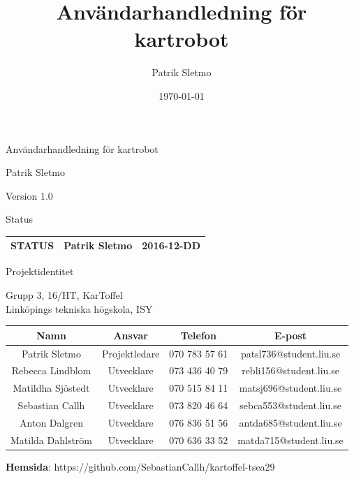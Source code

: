 \documentclass{article}
\title{Användarhandledning för kartrobot}
\author{Patrik Sletmo}
\date{\today}
\begin{document}
\thispagestyle{empty}

{
\sffamily
\centering
\large


{\huge 
Användarhandledning för kartrobot
}

{\large
Patrik Sletmo
}

{\large
Version 1.0
}

\vspace{3.5cm}

Status
\begin{table}[H]
\centering
\begin{tabular}{ | c | c | c | }
\hline
STATUS & Patrik Sletmo & 2016-12-DD \\
\hline
\end{tabular}
\end{table}
}
\clearpage

\vspace*{\fill}
{
\sffamily
\centering
\large


{\huge
Projektidentitet
}

{\large
Grupp 3, 16/HT, KarToffel \\ Linköpings tekniska högskola, ISY
}

\vspace{0.5cm}

\begin{table}[H]
\centering
\begin{tabular}{ | c | c | c | c |}
\hline
Namn & Ansvar & Telefon & E-post \\
\hline
Patrik Sletmo & Projektledare & 070 783 57 61 & patsl736@student.liu.se \\
\hline
Rebecca Lindblom & Utvecklare & 073 436 40 79 & rebli156@student.liu.se \\
\hline
Matildha Sjöstedt & Utvecklare & 070 515 84 11 & matsj696@student.liu.se \\
\hline
Sebastian Callh & Utvecklare & 073 820 46 64 & sebca553@student.liu.se \\
\hline
Anton Dalgren & Utvecklare & 076 836 51 56 & antda685@student.liu.se \\
\hline
Matilda Dahlström & Utvecklare & 070 636 33 52 & matda715@student.liu.se \\
\hline
\end{tabular}
\end{table}
}

\begin{center}
\textbf{Hemsida}: https://github.com/SebastianCallh/kartoffel-tsea29
\end{center}
\end{document}
